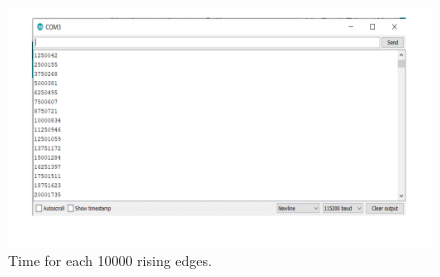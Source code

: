 \begin{refsection}
\begin{figure}[H]
	\centering
	\includegraphics[width=1\linewidth]{./sdf/arduino_quantum_rx/figures/Teste1.pdf}
	\caption{Time for each 10000 rising edges.}
	\label{montage}
\end{figure}


\end{refsection}
